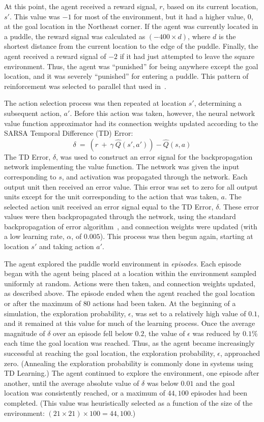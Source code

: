 \documentclass[preprint,12pt,authoryear]{elsarticle}
\begin{document}
At this point, the agent received a reward signal, $r$, based on its
current location, $s'$. This value was $-1$ for most of the
environment, but it had a higher value, $0$, at the goal location in
the Northeast corner. If the agent was currently located in a puddle,
the reward signal was calculated as $(-400 \times d)$, where $d$ is
the shortest distance from the current location to the edge of the
puddle. Finally, the agent received a reward signal of $-2$ if it had
just attempted to leave the square environment. Thus, the agent was
``punished'' for being anywhere except the goal location, and it was
severely ``punished'' for entering a puddle. This pattern of
reinforcement was selected to parallel that used
in~\citep{SuttonRS:1996:Coarse}.

The action selection process was then repeated at location $s'$,
determining a subsequent action, $a'$. Before this action was taken,
however, the neural network value function approximator had its
connection weights updated according to the SARSA Temporal Difference
(TD) Error:
\[ \delta \ = \ \left( r \ + \ \gamma \ \hat{Q}(s',a') \right) -
   \hat{Q}(s,a) \]
The TD Error, $\delta$, was used to construct an error signal for the
backpropagation network implementing the value function. The network
was given the input corresponding to $s$, and activation was
propagated through the network. Each output unit then received an
error value. This error was set to zero for all output units except
for the unit corresponding to the action that was taken, $a$. The 
selected action unit received an error signal equal to the TD Error,
$\delta$. These error values were then backpropagated through the
network, using the standard backpropagation of error
algorithm~\citep{RumelhartDE:1986:BP}, and connection weights were
updated (with a low learning rate, $\alpha$, of $0.005$). This process
was then begun again, starting at location $s'$ and taking action
$a'$.

The agent explored the puddle world environment in
\emph{episodes}. Each episode began with the agent being placed at a
location within the environment sampled uniformly at random. Actions
were then taken, and connection weights updated, as described
above. The episode ended when the agent reached the goal location or
after the maximum of $80$ actions had been taken. At the beginning of
a simulation, the exploration probability, $\epsilon$, was set to a
relatively high value of $0.1$, and it remained at this value for much
of the learning process. Once the average magnitude of $\delta$ over
an episode fell below $0.2$, the value of $\epsilon$ was reduced by
$0.1\%$ each time the goal location was reached. Thus, as the agent
became increasingly successful at reaching the goal location, the
exploration probability, $\epsilon$, approached zero. (Annealing the
exploration probability is commonly done in systems using TD
Learning.) The agent continued to explore the environment, one episode
after another, until the average absolute value of $\delta$ was below
$0.01$ and the goal location was consistently reached, or a maximum of
$44,100$ episodes had been completed. (This value was heuristically
selected as a function of the size of the environment: $(21 \times 21)
\times 100 = 44,100$.)
\end{document}
